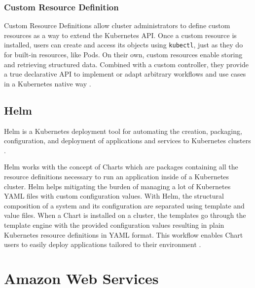 \subsubsection{Custom Resource Definition}

Custom Resource Definitions allow cluster administrators to define custom resources as a way to extend the Kubernetes API. Once a custom resource is installed, users can create and access its objects using \texttt{kubectl}, just as they do for built-in resources, like Pods. On their own, custom resources enable storing and retrieving structured data. Combined with a custom controller, they provide a true declarative API to implement or adapt arbitrary workflows and use cases in a Kubernetes native way \cite{KubernetesCRD}.

\subsection{Helm} \label{helm}

Helm is a Kubernetes deployment tool for automating the creation, packaging, configuration, and deployment of applications and services to Kubernetes clusters \cite{HelmWhatIs}.

Helm works with the concept of Charts which are packages containing all the resource definitions necessary to run an application inside of a Kubernetes cluster. Helm helps mitigating the burden of managing a lot of Kubernetes YAML files with custom configuration values. With Helm, the structural composition of a system and its configuration are separated using template and value files. When a Chart is installed on a cluster, the templates go through the template engine with the provided configuration values resulting in plain Kubernetes resource definitions in YAML format.  This workflow enables Chart users to easily deploy applications tailored to their environment \cite{Helm}.

\section{Amazon Web Services}

